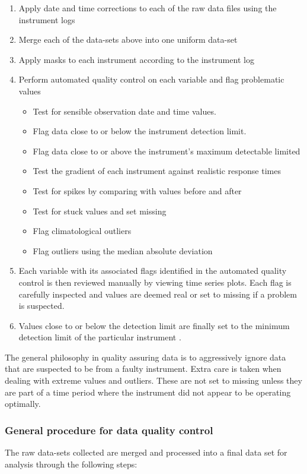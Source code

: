 \documentclass{nwureport}
\begin{document}
\begin{enumerate}
\item Apply date and time corrections to each of the raw data files
  using the instrument logs
\item Merge each of the data-sets above into one uniform data-set
\item Apply masks to each instrument according to the instrument log
\item Perform automated quality control on each variable and flag problematic values
  \begin{itemize}
   \item Test for sensible observation date and time values.
   \item Flag data close to or below the instrument detection limit. 
   \item Flag data close to or above the instrument's maximum detectable limited
   \item Test the gradient of each instrument against realistic response times
   \item Test for spikes by comparing with values before and after
   \item Test for stuck values and set missing
   \item Flag climatological outliers
   \item Flag outliers using the median absolute deviation
  \end{itemize}
\item Each variable with its associated flags identified in the automated quality control is then reviewed manually by viewing time series plots. Each flag is carefully inspected and values are deemed real or set to missing if a problem is suspected.
\item Values close to or below the detection limit are finally set to the minimum detection limit of the particular instrument \citep{Croghan2003}.
\end{enumerate}

The general philosophy in quality assuring data is to aggressively
ignore data that are suspected to be from a faulty instrument. Extra
care is taken when dealing with extreme values and outliers. These are
not set to missing unless they are part of a time period where the
instrument did not appear to be operating optimally.
\subsubsection{General procedure for data quality control}
The raw data-sets collected are merged and processed into a final data
set for analysis through the following steps:
\end{document}
